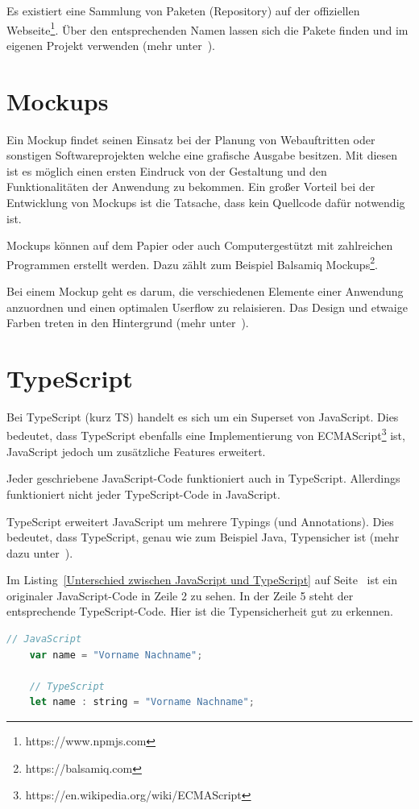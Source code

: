 Es existiert eine Sammlung von Paketen (Repository) auf der offiziellen Webseite\footnote{https://www.npmjs.com}. Über
den entsprechenden Namen lassen sich die Pakete finden und im eigenen Projekt verwenden
(mehr unter~\cite{book_grundlagen_npm}).

\section{Mockups}
Ein Mockup findet seinen Einsatz bei der Planung von Webauftritten oder sonstigen Softwareprojekten welche eine grafische
Ausgabe besitzen. Mit diesen ist es möglich einen ersten Eindruck von der Gestaltung und den Funktionalitäten der
Anwendung zu bekommen. Ein großer Vorteil bei der Entwicklung von Mockups ist die Tatsache, dass kein Quellcode dafür
notwendig ist.

Mockups können auf dem Papier oder auch Computergestützt mit zahlreichen Programmen erstellt werden. Dazu zählt zum
Beispiel Balsamiq Mockups\footnote{https://balsamiq.com}.

Bei einem Mockup geht es darum, die verschiedenen Elemente einer Anwendung anzuordnen und einen optimalen Userflow
zu relaisieren. Das Design und etwaige Farben treten in den Hintergrund (mehr unter~\cite{book_grundlagen_mockups}).

\section{TypeScript}
Bei TypeScript (kurz TS) handelt es sich um ein Superset von JavaScript. Dies bedeutet, dass TypeScript ebenfalls eine
Implementierung von ECMAScript\footnote{https://en.wikipedia.org/wiki/ECMAScript} ist, JavaScript jedoch um zusätzliche
Features erweitert.

Jeder geschriebene JavaScript-Code funktioniert auch in TypeScript. Allerdings funktioniert nicht jeder TypeScript-Code
in JavaScript.

TypeScript erweitert JavaScript um mehrere Typings (und Annotations). Dies bedeutet, dass TypeScript, genau wie zum
Beispiel Java, Typensicher ist (mehr dazu unter~\cite{book_grundlagen_typescript}).

Im Listing~\ref{Unterschied zwischen JavaScript und TypeScript} auf
Seite~\pageref{Unterschied zwischen JavaScript und TypeScript} ist ein originaler JavaScript-Code in Zeile 2 zu sehen.
In der Zeile 5 steht der entsprechende TypeScript-Code. Hier ist die Typensicherheit gut zu erkennen.

\begin{lstlisting}[language=JavaScript, caption=Unterschied zwischen JavaScript und TypeScript, label=Unterschied zwischen JavaScript und TypeScript]
    // JavaScript
    var name = "Vorname Nachname";

    // TypeScript
    let name : string = "Vorname Nachname";
\end{lstlisting}

